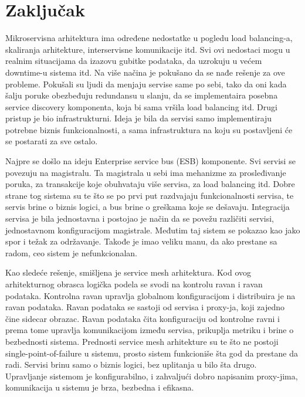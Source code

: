 \documentclass[a4paper,12pt]{report}
\begin{document}
\chapter{Zaključak}

Mikroservisna arhitektura ima određene nedostatke u pogledu load balancing-a, skaliranja arhitekture, interservisne komunikacije itd. Svi ovi nedostaci mogu u realnim situacijama da izazovu gubitke podataka, da uzrokuju u većem downtime-u sistema itd. Na više načina je pokušano da se nađe rešenje za ove probleme. Pokušali su ljudi da menjaju servise same po sebi, tako da oni kada šalju poruke obezbeđuju redundansu u slanju, da se implementaira posebna service discovery komponenta, koja bi sama vršila load balancing itd. Drugi pristup je bio infrastrukturni. Ideja je bila da servisi samo implementiraju potrebne biznis funkcionalnosti, a sama infrastruktura na koju su postavljeni će se postarati za sve ostalo. \newline

Najpre se došlo na ideju Enterprise service bus (ESB) komponente. Svi servisi se povezuju na magistralu. Ta magistrala u sebi ima mehanizme za prosleđivanje poruka, za transakcije koje obuhvataju više servisa, za load balancing itd. Dobre strane tog sistema su te što se po prvi put razdvajaju funkcionalnosti servisa, te servis brine o biznis logici, a bus brine o greškama koje se dešavaju. Integracija servisa je bila jednostavna i postojao je način da se povežu različiti servisi, jednostavnom konfiguracijom magistrale. Međutim taj sistem se pokazao kao jako spor i težak za održavanje. Takođe je imao veliku manu, da ako prestane sa radom, ceo sistem je nefunkcionalan. \newline

Kao sledeće rešenje, smišljena je service mesh arhitektura. Kod ovog arhitekturnog obrasca logička podela se svodi na kontrolu ravan i ravan podataka. Kontrolna ravan upravlja globalnom konfiguracijom i distribuira je na ravan podataka. Ravan podataka se sastoji od servisa i proxy-ja, koji zajedno čine sidecar obrazac. Ravan podataka čita konfiguraciju od kontrolne ravni i prema tome upravlja komunikacijom između servisa, prikuplja metriku i brine o bezbednosti sistema. Prednosti service mesh arhitekture su te što ne postoji single-point-of-failure u sistemu, prosto sistem funkcioniše šta god da prestane da radi. Servisi brinu samo o biznis logici, bez uplitanja u bilo šta drugo. Upravljanje sistemom je konfigurabilno, i zahvaljući dobro napisanim proxy-jima, komunikacija u sistemu je brza, bezbedna i efikasna. \newline
\end{document}

